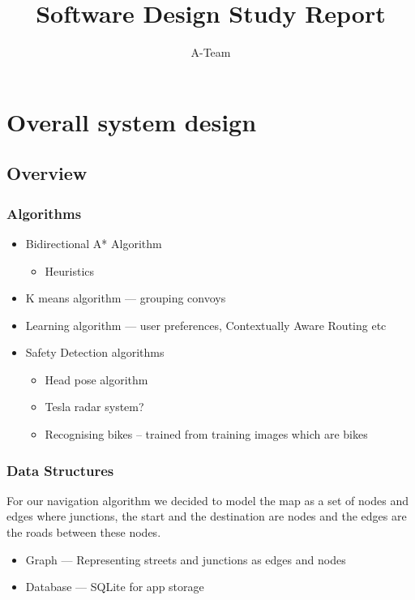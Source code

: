 \documentclass{article}
\title{Software Design Study Report}
\author{A-Team}
\begin{document}
\maketitle

\section{Overall system design}
\subsection{Overview}
\subsubsection{Algorithms}
  \begin{itemize}
      \item Bidirectional A* Algorithm
          \begin{itemize}
              \item Heuristics
          \end{itemize}
      \item K means algorithm --- grouping convoys
      \item Learning algorithm --- user preferences, Contextually Aware Routing etc
      \item Safety Detection algorithms
        \begin{itemize}
            \item Head pose algorithm
            \item Tesla radar system?
            \item Recognising bikes -- trained from training images which are bikes
        \end{itemize}
      
  \end{itemize}

\subsubsection{Data Structures}
For our navigation algorithm we decided to model the map as a set of nodes and edges where junctions, the start and the destination are nodes and the edges are the roads between these nodes.
  \begin{itemize}
      \item Graph --- Representing streets and junctions as edges and nodes
    	
      \item Database --- SQLite for app storage    
  \end{itemize}
\end{document}
